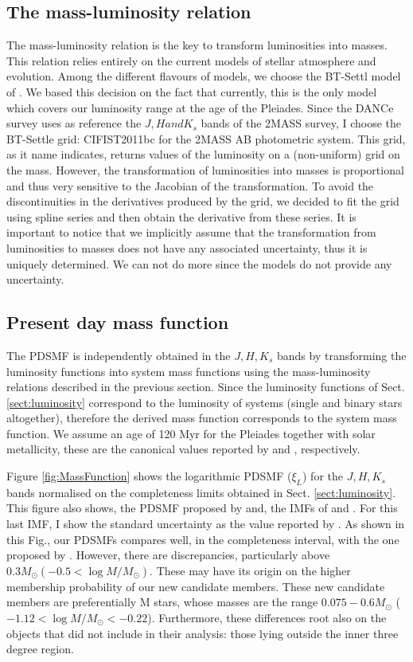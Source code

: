 \subsection{The mass-luminosity relation}
The mass-luminosity relation is the key to transform luminosities into masses. This relation relies entirely on the current models of stellar atmosphere and evolution. Among the different flavours of models, we choose the BT-Settl model of \citet{Allard2012}. We based this decision on the fact that currently, this is the only model which covers our luminosity range at the age of the Pleiades. Since the DANCe survey uses as reference the $J,H and K_s$ bands of the 2MASS survey, I choose the BT-Settle grid: CIFIST2011bc for the 2MASS AB photometric system. This grid, as it name indicates, returns values of the luminosity on a (non-uniform) grid on the mass. However,  the transformation of luminosities into masses is proportional and thus very sensitive to the Jacobian of the transformation. To avoid the discontinuities in the derivatives produced by the grid, we decided to fit the grid using spline series and then obtain the derivative from these series. It is important to notice that we implicitly assume that the transformation from luminosities to masses does not have any associated uncertainty, thus it is uniquely determined. We can not do more since the models do not provide any uncertainty. 

\subsection{Present day mass function}

The PDSMF is independently obtained in the $J,H,K_s$ bands by transforming the luminosity functions into system mass functions using the mass-luminosity relations described in the previous section. Since the luminosity functions of Sect. \ref{sect:luminosity} correspond to the luminosity of systems (single and binary stars altogether), therefore the derived mass function corresponds to the system mass function. We assume an age of 120 Myr for the Pleiades together with solar metallicity, these are the canonical values reported by \citet{} and \citet{}, respectively.

Figure \ref{fig:MassFunction} shows the logarithmic PDSMF ($\xi_L$) for the $J,H,K_s$ bands normalised on the completeness limits obtained in Sect. \ref{sect:luminosity}. This figure also shows, the PDSMF proposed by  \citet{Bouy2015} and, the IMFs of \citet{Thies2007} and \citet{Chabrier2005}. For this last IMF, I show the standard uncertainty as the value reported by \citet{Chabrier2003}. As shown in this Fig., our PDSMFs compares well, in the completeness interval, with the one proposed by \citet{Bouy2015}. However, there are discrepancies, particularly above $0.3 M_{\odot} (-0.5 < \log M/M_{\odot})$. These may have its origin on the higher membership probability of our new candidate members. These new candidate members are preferentially M stars, whose masses are the range $0.075 - 0.6 M_{\odot}$ ($-1.12 < \log M/M_{\odot} < -0.22$). Furthermore, these differences root also on the objects that \citet{Bouy2015} did not include in their analysis: those lying outside the inner three degree region. 

